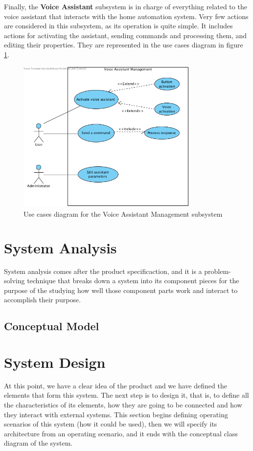 Finally, the \textbf{Voice Assistant} subsystem is in charge of everything related to the voice assistant that interacts with the
home automation system. Very few actions are considered in this subsystem, as its operation is quite simple. It includes actions 
for activating the assistant, sending commands and processing them, and editing their properties. They are represented in the
use cases diagram in figure \ref{fig:UC-voice-assistant-management}.

\begin{figure}
	\centering
	\includegraphics[width=0.8\textwidth]{images/Chapter_06/UC-voice-assistant-management.png}
	\caption{Use cases diagram for the Voice Assistant Management subsystem}
	\label{fig:UC-voice-assistant-management}
\end{figure}

\bigskip
\section{System Analysis}
System analysis comes after the product specificaction, and it is a problem-solving technique that breaks down a system into its 
component pieces for the purpose of the studying how well those component parts work and interact to accomplish their 
purpose.\cite{bentleySystemAnalysis}

\subsection{Conceptual Model}

\bigskip
\section{System Design}
At this point, we have a clear idea of the product and we have defined the elements that form this system. The next step is to design
it, that is, to define all the characteristics of its elements, how they are going to be connected and how they interact with external 
systems. This section begins defining operating scenarios of this system (how it could be used), then we will specify its architecture
from an operating scenario, and it ends with the conceptual class diagram of the system.

